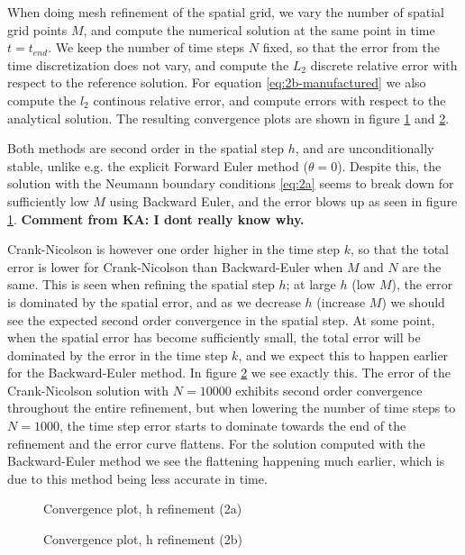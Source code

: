 When doing mesh refinement of the spatial grid, 
we vary the number of spatial grid points $M$, 
and compute the numerical solution at the same point in time $t=t_{end}$. 
We keep the number of time steps $N$ fixed, 
so that the error from the time discretization does not vary, 
and compute the $L_2$ discrete relative error with respect to the reference solution. 
For equation \eqref{eq:2b-manufactured} we also compute the $l_2$ continous relative error, 
and compute errors with respect to the analytical solution. 
The resulting convergence plots are shown in figure \ref{fig:2a-convergence} and \ref{fig:2b-convergence}. 

Both methods are second order in the spatial step $h$, 
and are unconditionally stable, 
unlike e.g. the explicit Forward Euler method ($\theta=0$). 
Despite this, 
the solution with the Neumann boundary conditions \ref{eq:2a} seems to break down for sufficiently low $M$ using Backward Euler, 
and the error blows up as seen in figure \ref{fig:2a-convergence}. 
\textbf{Comment from KA: I dont really know why.}

Crank-Nicolson is however one order higher in the time step $k$, 
so that the total error is lower for Crank-Nicolson than Backward-Euler when $M$ and $N$ are the same. 
This is seen when refining the spatial step $h$; 
at large $h$ (low $M$), 
the error is dominated by the spatial error, 
and as we decrease $h$ (increase $M$) we should see the expected second order convergence in the spatial step. 
At some point, 
when the spatial error has become sufficiently small, 
the total error will be dominated by the error in the time step $k$, 
and we expect this to happen earlier for the Backward-Euler method. 
In figure \ref{fig:2b-convergence} we see exactly this. 
The error of the Crank-Nicolson solution with $N=10000$ exhibits second order convergence throughout the entire refinement, 
but when lowering the number of time steps to $N=1000$, 
the time step error starts to dominate towards the end of the refinement and the error curve flattens. 
For the solution computed with the Backward-Euler method we see the flattening happening much earlier, 
which is due to this method being less accurate in time. 

\begin{figure}[ht]
    \centering
    
    \caption{Convergence plot, h refinement (2a)}
    \label{fig:2a-convergence}
\end{figure}

\begin{figure}[ht]
    \centering
    
    \caption{Convergence plot, h refinement (2b)}
    \label{fig:2b-convergence}
\end{figure}

